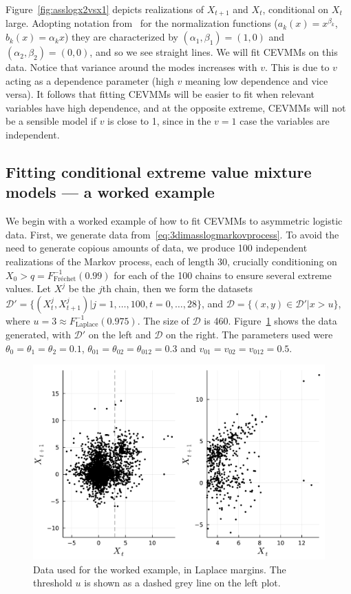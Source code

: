 \documentclass[11pt,twoside,openany]{book}
\newcommand{\D}{\mathcal{D}}
\numberwithin{Theorem}{chapter}
\numberwithin{Definition}{chapter}
\numberwithin{Lemma}{chapter}
\numberwithin{Algorithm}{chapter}
\numberwithin{equation}{chapter}
\begin{document}
Figure~\ref{fig:asslogx2vsx1} depicts realizations of $X_{t+1}$ and $X_{t}$,
conditional on $X_{t}$ large. Adopting notation from~\cite{keef2013estimation} for the
normalization functions ($a_k(x) = x^{\beta_k}$, $b_k(x) = \alpha_k x$) they
are characterized by $(\alpha_1,\beta_1)=(1,0)$ and $(\alpha_2,\beta_2)=(0,0)$,
and so we see straight lines. We will fit CEVMMs on this data. Notice that
variance around the modes increases with $v$. This is due to $v$ acting as a
dependence parameter (high $v$ meaning low dependence and vice versa). It
follows that fitting CEVMMs will be easier to fit when relevant variables have
high dependence, and at the opposite extreme, CEVMMs will not be a sensible
model if $v$ is close to 1, since in the $v=1$ case the variables are
independent.

\clearpage
\subsection{Fitting conditional extreme value mixture models --- a worked example}\label{sec:worked_example}

We begin with a worked example of how to fit CEVMMs
to asymmetric logistic data.
First, we generate data from~\eqref{eq:3dimasslogmarkovprocess}. To avoid
the need to generate copious amounts of data, we produce 100 independent
realizations of the Markov process, each of length 30, crucially conditioning on $X_{0} > q
= F_{\text{Fréchet}}^{-1}(0.99)$ for each of the 100 chains to ensure
several extreme values. Let $X^j$ be the $j$th chain, then we form the datasets
$\D' = \{(X^j_{t},X_{t+1}^j) | j=1,\ldots,100, t=0,\ldots,28\}$,
and $\D = \{(x,y)\in \D' | x > u\}$, where $u=3\approx F_{\text{Laplace}}^{-1}(0.975)$.
The size of $\D$ is 460. Figure~\ref{fig:worked_example_data} shows the data generated, with $\D'$ on the
left and $\D$ on the right. The parameters used were
$\theta_0=\theta_1=\theta_2=0.1$, $\theta_{01}=\theta_{02}=\theta_{012}=0.3$
and $v_{01}=v_{02}=v_{012}=0.5$.
\begin{figure}[htp]
  \centering
  \includegraphics[scale=0.7]{../ht-em/figures/worked_example_data.pdf}
  \caption{Data used for the worked example, in Laplace margins. The threshold
    $u$ is shown as a dashed grey line on the left plot.
}\label{fig:worked_example_data}
\end{figure}
\end{document}
